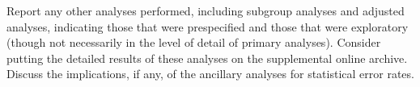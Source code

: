 Report any other analyses performed, including subgroup analyses and adjusted analyses, indicating those that were prespecified and those that were exploratory (though not necessarily in the level of detail of primary analyses). Consider putting the detailed results of these analyses on the supplemental online archive. Discuss the implications, if any, of the ancillary analyses for statistical error rates.